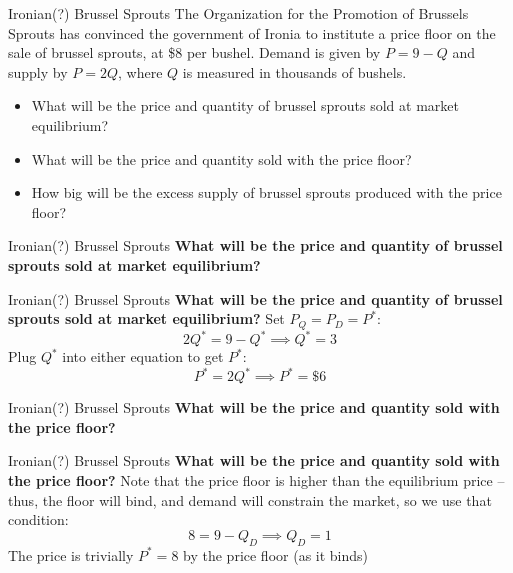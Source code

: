 \documentclass{beamer}
\begin{document}
\begin{frame}[t]{Ironian(?) Brussel Sprouts}
    The Organization for the Promotion of Brussels Sprouts has convinced the government of Ironia to institute a price floor on the sale of brussel sprouts, at \$8 per bushel. Demand is given by $P = 9 - Q$ and supply by $P = 2Q$, where $Q$ is measured in thousands of bushels.
    \begin{itemize}
        \item What will be the price and quantity of brussel sprouts sold at market equilibrium?
        \item What will be the price and quantity sold with the price floor?
        \item How big will be the excess supply of brussel sprouts produced with the price floor?
    \end{itemize}
\end{frame}

\begin{frame}[t]{Ironian(?) Brussel Sprouts}
   \textbf{ What will be the price and quantity of brussel sprouts sold at market equilibrium?}
\end{frame}

\begin{frame}[t]{Ironian(?) Brussel Sprouts}
    \textbf{What will be the price and quantity of brussel sprouts sold at market equilibrium?}
    \newline
    \newline Set $P_Q = P_D = P^*$:
    \[2Q^* = 9-Q^* \implies \boxed{Q^* = 3}\]
    Plug $Q^*$ into either equation to get $P^*$:
    \[P^* = 2Q^* \implies \boxed{P^* = \$6}\]
\end{frame}

\begin{frame}[t]{Ironian(?) Brussel Sprouts}
    \textbf{What will be the price and quantity sold with the price floor?}
\end{frame}

\begin{frame}[t]{Ironian(?) Brussel Sprouts}
    \textbf{What will be the price and quantity sold with the price floor?}
    \newline
    \newline Note that the price floor is higher than the equilibrium price -- thus, the floor will bind, and demand will constrain the market, so we use that condition:
    \[8 = 9 - Q_D \implies \boxed{Q_D = 1}\]
    The price is trivially $P^* = 8$ by the price floor (as it binds)
\end{frame}
\end{document}
